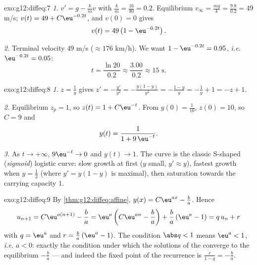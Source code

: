 \begin{solution}{exo:g12:diffeq:7}
\emph{1.} $v' = g - \frac{k}{m} v$ with $\frac km = \frac{16}{80} = 0.2$.
Equilibrium $v_\infty = \frac{mg}{k} = \frac{9.8}{0.2} = 49$ m/s;
$v(t) = 49 + C\eu^{-0.2t}$, and $v(0) = 0$ gives
\[
v(t) = 49\left(1 - \eu^{-0.2 t}\right).
\]

\emph{2.} Terminal velocity $49$ m/s ($\approx 176$ km/h). We want
$1 - \eu^{-0.2t} = 0.95$, \emph{i.e.} $\eu^{-0.2t} = 0.05$:
\[
t = \frac{\ln 20}{0.2} \approx \frac{3.00}{0.2} \approx 15 \text{ s}.
\]
\end{solution}

\begin{solution}{exo:g12:diffeq:8}
\emph{1.} $z = \frac1y$ gives $z' = -\frac{y'}{y^2}
= -\frac{y(1-y)}{y^2} = -\frac{1-y}{y} = -\frac1y + 1 = -z + 1$.

\emph{2.} Equilibrium $z_p = 1$, so $z(t) = 1 + C\eu^{-t}$. From
$y(0) = \frac{1}{10}$, $z(0) = 10$, so $C = 9$ and
\[
y(t) = \frac{1}{1 + 9\,\eu^{-t}} .
\]

\emph{3.} As $t \to +\infty$, $9\eu^{-t} \to 0$ and $y(t) \to 1$. The curve
is the classic S-shaped (\emph{sigmoid}) logistic curve: slow growth at
first ($y$ small, $y' \approx y$), fastest growth when $y = \frac12$
(where $y' = y(1-y)$ is maximal), then saturation towards the carrying
capacity $1$.
\end{solution}

\begin{solution}{exo:g12:diffeq:9}
By \cref{thm:g12:diffeq:affine}, $y(x) = C\eu^{ax} - \frac ba$. Hence
\[
u_{n+1} = C\eu^{a(n+1)} - \frac ba
= \eu^{a}\left(C\eu^{an} - \frac ba\right) + \frac ba\left(\eu^a - 1\right)
= q\,u_n + r
\]
with $q = \eu^{a}$ and $r = \frac{b}{a}\left(\eu^{a} - 1\right)$.
The condition $\abs q < 1$ means $\eu^a < 1$, \emph{i.e.} $a < 0$: exactly
the condition under which the solutions of the 
converge to the equilibrium $-\frac ba$ --- and indeed the fixed point of
the recurrence is $\frac{r}{1 - q} = -\frac{b}{a}$.
\end{solution}
